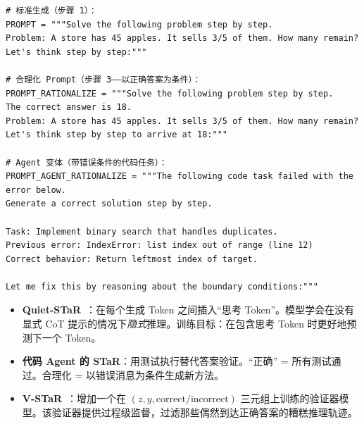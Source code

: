 \begin{examplebox}
\begin{lstlisting}[style=pythonstyle]
# 标准生成（步骤 1）：
PROMPT = """Solve the following problem step by step.
Problem: A store has 45 apples. It sells 3/5 of them. How many remain?
Let's think step by step:"""

# 合理化 Prompt（步骤 3——以正确答案为条件）：
PROMPT_RATIONALIZE = """Solve the following problem step by step.
The correct answer is 18.
Problem: A store has 45 apples. It sells 3/5 of them. How many remain?
Let's think step by step to arrive at 18:"""

# Agent 变体（带错误条件的代码任务）：
PROMPT_AGENT_RATIONALIZE = """The following code task failed with the error below.
Generate a correct solution step by step.

Task: Implement binary search that handles duplicates.
Previous error: IndexError: list index out of range (line 12)
Correct behavior: Return leftmost index of target.

Let me fix this by reasoning about the boundary conditions:"""
\end{lstlisting}
\end{examplebox}

\begin{intuitionbox}
\begin{itemize}
  \item \textbf{Quiet-STaR}~\cite{zelikman2024quietstar}：在每个生成 Token 之间插入``思考 Token''。模型学会在没有显式 CoT 提示的情况下\emph{隐式}推理。训练目标：在包含思考 Token 时更好地预测下一个 Token。
  \item \textbf{代码 Agent 的 STaR}：用测试执行替代答案验证。``正确'' = 所有测试通过。合理化 = 以错误消息为条件生成新方法。
  \item \textbf{V-STaR}~\cite{hosseini2024vstar}：增加一个在 $(z, y, \text{correct/incorrect})$ 三元组上训练的验证器模型。该验证器提供过程级监督，过滤那些偶然到达正确答案的糟糕推理轨迹。
\end{itemize}
\end{intuitionbox}

